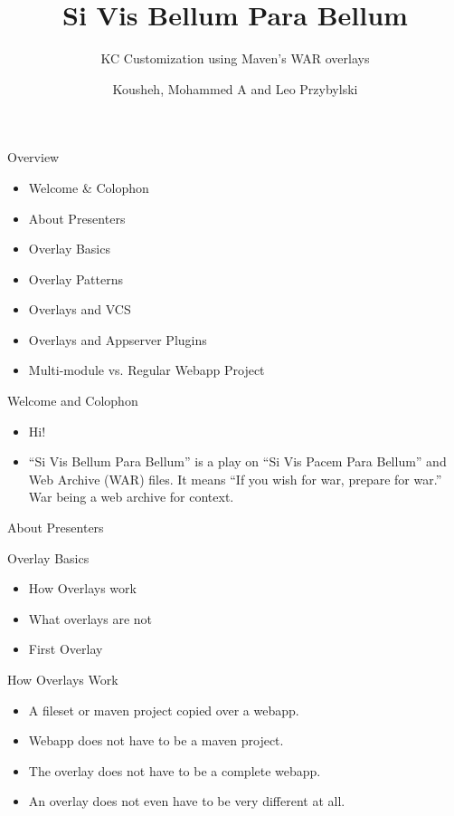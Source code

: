 \documentclass[xcolor=dvipsnames,14pt]{beamer}
\begin{document}
\title{Si Vis Bellum Para Bellum}
\subtitle{KC Customization using Maven's WAR overlays}
\author[Leo]{Kousheh, Mohammed A and Leo Przybylski}

\begin{frame}[plain]
  \titlepage
\end{frame}

\begin{frame}{Overview}
  \begin{itemize}
  \item Welcome \& Colophon
  \item About Presenters
  \item Overlay Basics
  \item Overlay Patterns
  \item Overlays and VCS
  \item Overlays and Appserver Plugins
  \item Multi-module vs. Regular Webapp Project
  \end{itemize}
\end{frame}

\begin{frame}{Welcome and Colophon}
  \begin{itemize}
    \item Hi!
    \item ``Si Vis Bellum Para Bellum'' is a play on ``Si Vis Pacem
      Para Bellum'' and Web Archive (WAR) files. It means ``If you
      wish for war, prepare for war.'' War being a web archive for context.
  \end{itemize}
\end{frame}

\begin{frame}{About Presenters}
\end{frame}

\begin{frame}{Overlay Basics}
  \begin{itemize}
  \item How Overlays work
  \item What overlays are not
  \item First Overlay
  \end{itemize}
\end{frame}

\begin{frame}{How Overlays Work}
  \begin{itemize}
    \item A fileset or maven project copied over a webapp.
    \item Webapp does not have to be a maven project.
    \item The overlay does not have to be a complete webapp.
    \item An overlay does not even have to be very different at all.
  \end{itemize}
\end{frame}
\end{document}
